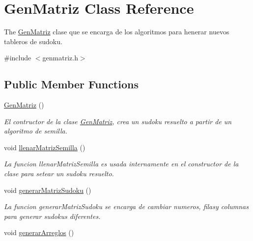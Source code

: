 \hypertarget{class_gen_matriz}{\section{Gen\-Matriz Class Reference}
\label{class_gen_matriz}
}


The \hyperlink{class_gen_matriz}{Gen\-Matriz} clase que se encarga de los algoritmos para henerar nuevos tableros de sudoku.  




{\ttfamily \#include $<$genmatriz.\-h$>$}

\subsection*{Public Member Functions}
\begin{DoxyCompactItemize}
\item 
\hypertarget{class_gen_matriz_a8fac64f00cae60f47afbf6cf43346832}{\hyperlink{class_gen_matriz_a8fac64f00cae60f47afbf6cf43346832}{Gen\-Matriz} ()}\label{class_gen_matriz_a8fac64f00cae60f47afbf6cf43346832}

\begin{DoxyCompactList}\small\item\em El contructor de la clase \hyperlink{class_gen_matriz}{Gen\-Matriz}, crea un sudoku resuelto a partir de un algoritmo de semilla. \end{DoxyCompactList}\item 
\hypertarget{class_gen_matriz_ae4e6b5ed243424a06becc3b9296fe520}{void \hyperlink{class_gen_matriz_ae4e6b5ed243424a06becc3b9296fe520}{llenar\-Matriz\-Semilla} ()}\label{class_gen_matriz_ae4e6b5ed243424a06becc3b9296fe520}

\begin{DoxyCompactList}\small\item\em La funcion llenar\-Matriz\-Semilla es usada internamente en el constructor de la clase para setear un sudoku resuelto. \end{DoxyCompactList}\item 
\hypertarget{class_gen_matriz_a68e793d89185716f36367320262723eb}{void \hyperlink{class_gen_matriz_a68e793d89185716f36367320262723eb}{generar\-Matriz\-Sudoku} ()}\label{class_gen_matriz_a68e793d89185716f36367320262723eb}

\begin{DoxyCompactList}\small\item\em La funcion generar\-Matriz\-Sudoku se encarga de cambiar numeros, filasy columnas para generar sudokus diferentes. \end{DoxyCompactList}\item 
\hypertarget{class_gen_matriz_ac8b87d3d6f8402ce11b0e8c2e54267f4}{void \hyperlink{class_gen_matriz_ac8b87d3d6f8402ce11b0e8c2e54267f4}{generar\-Arreglos} ()}\label{class_gen_matriz_ac8b87d3d6f8402ce11b0e8c2e54267f4}


\end{DoxyCompactItemize}
